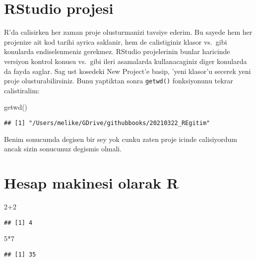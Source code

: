 \documentclass[
]{book}
\newenvironment{Shaded}{\begin{snugshade}}{\end{snugshade}}
\newcommand{\DecValTok}[1]{\textcolor[rgb]{0.00,0.00,0.81}{#1}}
\newcommand{\FunctionTok}[1]{\textcolor[rgb]{0.00,0.00,0.00}{#1}}
\newcommand{\NormalTok}[1]{#1}
\newcommand{\SpecialCharTok}[1]{\textcolor[rgb]{0.00,0.00,0.00}{#1}}
\begin{document}
\hypertarget{rstudio-projesi}{%
\section{RStudio projesi}\label{rstudio-projesi}}

R'da calisirken her zaman proje olusturmanizi tavsiye ederim. Bu sayede hem her projenize ait kod tarihi ayrica saklanir, hem de calistiginiz klasor vs.~gibi konularda endiselenmeniz gerekmez. RStudio projelerinin bunlar haricinde versiyon kontrol konusu vs.~gibi ileri asamalarda kullanacaginiz diger konularda da fayda saglar. Sag ust kosedeki New Project'e basip, 'yeni klasor'u secerek yeni proje olusturabilirsiniz. Bunu yaptiktan sonra \texttt{getwd()} fonksiyonunu tekrar calistiralim:

\begin{Shaded}
\begin{Highlighting}[]
\FunctionTok{getwd}\NormalTok{()}
\end{Highlighting}
\end{Shaded}

\begin{verbatim}
## [1] "/Users/melike/GDrive/githubbooks/20210322_REgitim"
\end{verbatim}

Benim sonucumda degisen bir sey yok cunku zaten proje icinde calisiyordum ancak sizin sonucunuz degismis olmali.

\hypertarget{hesap-makinesi-olarak-r}{%
\section{Hesap makinesi olarak R}\label{hesap-makinesi-olarak-r}}

\begin{Shaded}
\begin{Highlighting}[]
\DecValTok{2}\SpecialCharTok{+}\DecValTok{2}
\end{Highlighting}
\end{Shaded}

\begin{verbatim}
## [1] 4
\end{verbatim}

\begin{Shaded}
\begin{Highlighting}[]
\DecValTok{5}\SpecialCharTok{*}\DecValTok{7}
\end{Highlighting}
\end{Shaded}

\begin{verbatim}
## [1] 35
\end{verbatim}
\end{document}
